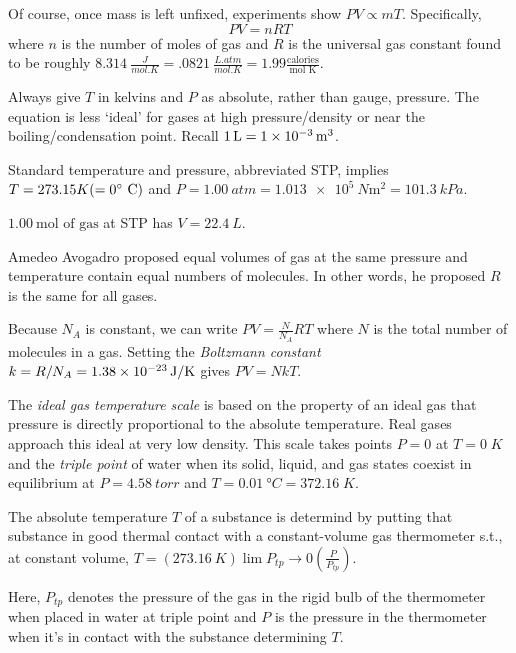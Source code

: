 \begin{definition}
    Of course, once mass is left unfixed, experiments show $PV \propto mT$. Specifically, $$PV = nRT$$ where $n$ is the number of moles of gas and $R$ is the universal gas constant found to be roughly $\qty{8.314}{\frac{J}{mol.K}} = \qty{.0821}{\frac{L.atm}{mol.K}} = 1.99 \frac{\text{calories}}{\text{mol K}}$.
\end{definition}
\begin{remark}
    Always give $T$ in kelvins and $P$ as absolute, rather than gauge, pressure. The equation is less `ideal' for gases at high pressure/density or near the boiling/condensation point. Recall $\qty{1}{L} = \qty{1e{-3}}{m^3}$.
\end{remark}
\begin{definition}
    Standard temperature and pressure, abbreviated STP, implies $T = 273.15 K ( = 0\operatorname{\!^{\circ}\!} \text{ C})$ and $P = \qty{1.00}{atm} = \qty{1.013e5}{N\m^2}=\qty{101.3}{kPa}$.
\end{definition}
\begin{note}
    $\qty{1.00}{\text{mol of gas}}$ at STP has $V = \qty{22.4}{L}$.
\end{note}
\begin{remark}
    Amedeo Avogadro proposed equal volumes of gas at the same pressure and temperature contain equal numbers of molecules. In other words, he proposed $R$ is the same for all gases. 
\end{remark}
\begin{definition}
    Because $N_A$ is constant, we can write $PV = \frac{N}{N_A}RT$ where $N$ is the total number of molecules in a gas. Setting the \emph{Boltzmann constant} $k = R/N_A = \qty{1.38e{-23}}{J/K}$ gives $PV=NkT$.
\end{definition}
\begin{definition}
    The \emph{ideal gas temperature scale} is based on the property of an ideal gas that pressure is  directly proportional to the absolute temperature. Real gases approach this ideal at very low density. This scale takes points $P=0$ at $T=0\;K$ and the \emph{triple point} of water when its solid, liquid, and gas states coexist in equilibrium at $P = \qty{4.58}{torr}$ and $T=\qty{0.01}{\degree C} = 372.16\;K$.
\end{definition}
\begin{definition}
    The absolute temperature $T$ of a substance is determind by putting that substance in good thermal contact with a constant-volume gas thermometer s.t., at constant volume, $T = (\qty{273.16}{K})\lim\limits{P_{tp}\to0}(\frac{P}{P_{tp}})$.

    Here, $P_{tp}$ denotes the pressure of the gas in the rigid bulb of the thermometer when placed in water at triple point and $P$ is the pressure in the thermometer when it's in contact with the substance determining $T$.
\end{definition}